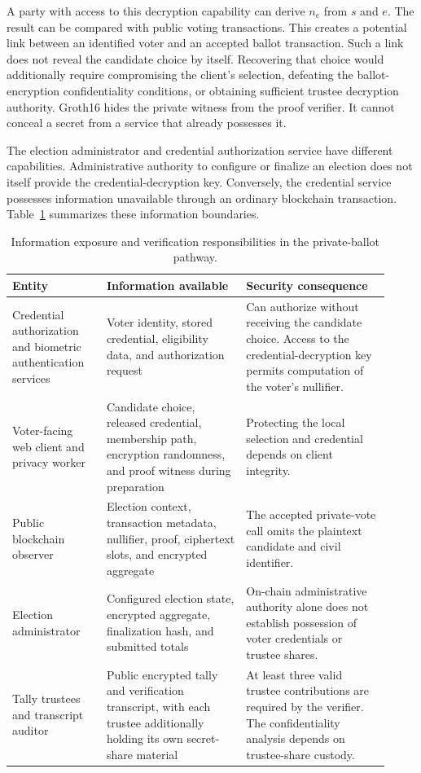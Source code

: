 A party with access to this decryption capability can derive $n_e$ from $s$
and $e$. The result can be compared with public voting transactions. This
creates a potential link between an identified voter and an accepted ballot
transaction.
Such a link does not reveal the candidate choice by itself. Recovering that
choice would additionally require compromising the client's selection,
defeating the ballot-encryption confidentiality conditions, or obtaining
sufficient trustee decryption authority. Groth16 hides the private witness
from the proof verifier. It cannot conceal a secret from a service that
already possesses it.

The election administrator and credential authorization service have
different capabilities. Administrative authority to configure or finalize an
election does not itself provide the credential-decryption key. Conversely,
the credential service possesses information unavailable through an ordinary
blockchain transaction. Table~\ref{tab:system-visibility} summarizes these
information boundaries.

\begin{table}[t]
\centering
\caption{Information exposure and verification responsibilities in the private-ballot pathway.}
\label{tab:system-visibility}
\small
\begin{tabular}{@{}p{0.23\linewidth}p{0.34\linewidth}p{0.35\linewidth}@{}}
\toprule
\textbf{Entity} & \textbf{Information available} & \textbf{Security consequence} \\
\midrule
Credential authorization and biometric authentication services
& Voter identity, stored credential, eligibility data, and authorization request
& Can authorize without receiving the candidate choice. Access to the credential-decryption key permits computation of the voter's nullifier. \\
\addlinespace
Voter-facing web client and privacy worker
& Candidate choice, released credential, membership path, encryption randomness, and proof witness during preparation
& Protecting the local selection and credential depends on client integrity. \\
\addlinespace
Public blockchain observer
& Election context, transaction metadata, nullifier, proof, ciphertext slots, and encrypted aggregate
& The accepted private-vote call omits the plaintext candidate and civil identifier. \\
\addlinespace
Election administrator
& Configured election state, encrypted aggregate, finalization hash, and submitted totals
& On-chain administrative authority alone does not establish possession of voter credentials or trustee shares. \\
\addlinespace
Tally trustees and transcript auditor
& Public encrypted tally and verification transcript, with each trustee additionally holding its own secret-share material
& At least three valid trustee contributions are required by the verifier. The confidentiality analysis depends on trustee-share custody. \\
\bottomrule
\end{tabular}
\end{table}

